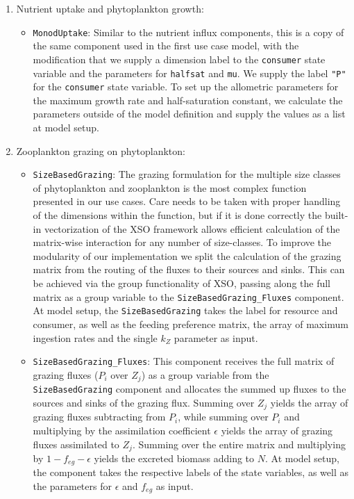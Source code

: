 \documentclass[journal abbreviation, manuscript]{copernicus}
\begin{document}
\begin{enumerate}
    \item Nutrient uptake and phytoplankton growth: 
    \begin{itemize}
        \item \texttt{MonodUptake}: Similar to the nutrient influx components, this is a copy of the same component used in the first use case model, with the modification that we supply a dimension label to the \texttt{consumer} state variable and the parameters for \texttt{halfsat} and \texttt{mu}. We supply the label \texttt{"P"} for the \texttt{consumer} state variable. To set up the allometric parameters for the maximum growth rate and half-saturation constant, we calculate the parameters outside of the model definition and supply the values as a list at model setup.
    \end{itemize}
    
    \item Zooplankton grazing on phytoplankton: 
    \begin{itemize}
        \item \texttt{SizeBasedGrazing}: The grazing formulation for the multiple size classes of phytoplankton and zooplankton is the most complex function presented in our use cases. Care needs to be taken with proper handling of the dimensions within the function, but if it is done correctly the built-in vectorization of the XSO framework allows efficient calculation of the matrix-wise interaction for any number of size-classes. To improve the modularity of our implementation we split the calculation of the grazing matrix from the routing of the fluxes to their sources and sinks. This can be achieved via the group functionality of XSO, passing along the full matrix as a group variable to the \texttt{SizeBasedGrazing\_Fluxes} component. At model setup, the \texttt{SizeBasedGrazing} takes the label for resource and consumer, as well as the feeding preference matrix, the array of maximum ingestion rates and the single $k_Z$ parameter as input.
        \item \texttt{SizeBasedGrazing\_Fluxes}: This component receives the full matrix of grazing fluxes ($P_i$ over $Z_j$) as a group variable from the \texttt{SizeBasedGrazing} component and allocates the summed up fluxes to the sources and sinks of the grazing flux. Summing over $Z_j$ yields the array of grazing fluxes subtracting from $P_i$, while summing over $P_i$ and multiplying by the assimilation coefficient $\epsilon$ yields the array of grazing fluxes assimilated to $Z_j$. Summing over the entire matrix and multiplying by $1 - f_{eg} - \epsilon$ yields the excreted biomass adding to $N$. At model setup, the component takes the respective labels of the state variables, as well as the parameters for $\epsilon$ and $f_{eg}$ as input.
    \end{itemize}
    

\end{enumerate}
\end{document}
